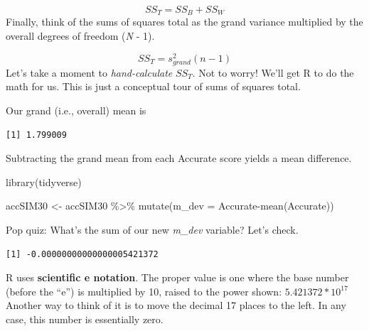 \documentclass[
  english,
]{book}
\newenvironment{Shaded}{\begin{snugshade}}{\end{snugshade}}
\newcommand{\AttributeTok}[1]{\textcolor[rgb]{0.77,0.63,0.00}{#1}}
\newcommand{\FunctionTok}[1]{\textcolor[rgb]{0.00,0.00,0.00}{#1}}
\newcommand{\NormalTok}[1]{#1}
\newcommand{\OtherTok}[1]{\textcolor[rgb]{0.56,0.35,0.01}{#1}}
\newcommand{\SpecialCharTok}[1]{\textcolor[rgb]{0.00,0.00,0.00}{#1}}
\begin{document}
\[SS_{T}= SS_{B} + SS_{W}\]
Finally, think of the sums of squares total as the grand variance multiplied by the overall degrees of freedom (\emph{N} - 1).

\[SS_{T}= s_{grand}^{2}(n-1)\]
Let's take a moment to \emph{hand-calculate} \(SS_{T}\). Not to worry! We'll get R to do the math for us. This is just a conceptual tour of sums of squares total.

Our grand (i.e., overall) mean is

\begin{Shaded}
\end{Shaded}

\begin{verbatim}
[1] 1.799009
\end{verbatim}

Subtracting the grand mean from each Accurate score yields a mean difference.

\begin{Shaded}
\begin{Highlighting}[]
\FunctionTok{library}\NormalTok{(tidyverse)}

\NormalTok{accSIM30 }\OtherTok{\textless{}{-}}\NormalTok{ accSIM30 }\SpecialCharTok{\%\textgreater{}\%} 
  \FunctionTok{mutate}\NormalTok{(}\AttributeTok{m\_dev =}\NormalTok{ Accurate}\SpecialCharTok{{-}}\FunctionTok{mean}\NormalTok{(Accurate))}
\end{Highlighting}
\end{Shaded}

Pop quiz: What's the sum of our new \emph{m\_dev} variable? Let's check.

\begin{Shaded}
\end{Shaded}

\begin{verbatim}
[1] -0.00000000000000005421372
\end{verbatim}

R uses \textbf{scientific e notation}. The proper value is one where the base number (before the ``e'') is multiplied by 10, raised to the power shown: \(5.421372 * 10^{17}\) Another way to think of it is to move the decimal 17 places to the left. In any case, this number is essentially zero.
\end{document}

